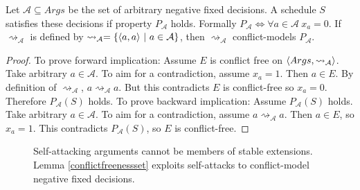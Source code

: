 \begin{lemma}
	\label{conflictfreenessset}
	Let $\mathcal{A}\subseteq Args$ be the set of arbitrary negative fixed decisions. A schedule $S$ satisfies these decisions if property $P_\mathcal{A}$ holds. Formally $P_\mathcal{A}\iff\forall a\in\mathcal{A}\ x_a=0$. If $\rightsquigarrow_\mathcal{A}$ is defined by $\rightsquigarrow_\mathcal{A}=\{\pair{a}{a}\ |\ a\in\mathcal{A}\}$, then $\rightsquigarrow_\mathcal{A}$ conflict-models $P_\mathcal{A}$.

	\begin{proof}
		To prove forward implication: Assume $E$ is conflict free on $\langle{Args},{\rightsquigarrow_\mathcal{A}}\rangle$. Take arbitrary $a\in\mathcal{A}$. To aim for a contradiction, assume $x_a=1$. Then $a\in E$. By definition of $\rightsquigarrow_\mathcal{A}$, $a\rightsquigarrow_\mathcal{A} a$. But this contradicts $E$ is conflict-free so $x_a=0$. Therefore $P_\mathcal{A}(S)$ holds.
		\linespace
		To prove backward implication: Assume $P_\mathcal{A}(S)$ holds. Take arbitrary $a\in\mathcal{A}$. To aim for a contradiction, assume $a\rightsquigarrow_\mathcal{A}a$. Then $a\in E$, so $x_a=1$. This contradicts $P_\mathcal{A}(S)$, so $E$ is conflict-free.
	\end{proof}
\end{lemma}

\begin{figure}[H]
	\centering
	\caption{Self-attacking arguments cannot be members of stable extensions. Lemma \ref{conflictfreenessset} exploits self-attacks to conflict-model negative fixed decisions.}
\end{figure}

